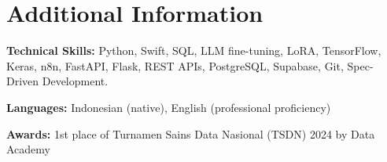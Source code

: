 \documentclass[10pt,a4paper]{article}
\begin{document}
\section{Additional Information}

\textbf{Technical Skills:} Python, Swift, SQL, LLM fine-tuning, LoRA, TensorFlow, Keras, n8n, FastAPI, Flask, REST APIs, PostgreSQL, Supabase, Git, Spec-Driven Development.\par
\vspace{2pt}
\textbf{Languages:} Indonesian (native), English (professional proficiency)\par
\vspace{2pt}
\textbf{Awards:} 1st place of Turnamen Sains Data Nasional (TSDN) 2024 by Data Academy
\end{document}
